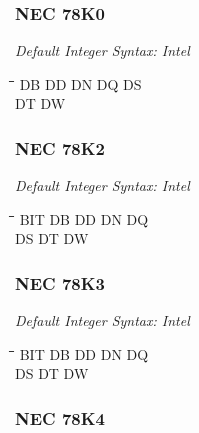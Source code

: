 \subsubsection{NEC 78K0}

{\em Default Integer Syntax: Intel}

{\tt\begin{tabbing}
\hspace{3cm}\=\hspace{3cm}\=\hspace{3cm}\=\hspace{3cm}\=\kill
DB         \> DD          \> DN          \> DQ          \> DS \\
DT         \> DW \\
\end{tabbing}}

\subsubsection{NEC 78K2}

{\em Default Integer Syntax: Intel}

{\tt\begin{tabbing}
\hspace{3cm}\=\hspace{3cm}\=\hspace{3cm}\=\hspace{3cm}\=\kill
BIT        \> DB         \> DD          \> DN          \> DQ \\
DS         \> DT         \> DW \\
\end{tabbing}}

\subsubsection{NEC 78K3}

{\em Default Integer Syntax: Intel}

{\tt\begin{tabbing}
\hspace{3cm}\=\hspace{3cm}\=\hspace{3cm}\=\hspace{3cm}\=\kill
BIT        \> DB         \> DD          \> DN          \> DQ \\
DS         \> DT         \> DW \\
\end{tabbing}}

\subsubsection{NEC 78K4}

